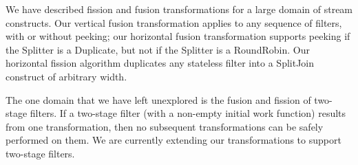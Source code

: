 We have described fission and fusion transformations for a large
domain of stream constructs.  Our vertical fusion transformation
applies to any sequence of filters, with or without peeking; our
horizontal fusion transformation supports peeking if the Splitter is a
Duplicate, but not if the Splitter is a RoundRobin.  Our horizontal
fission algorithm duplicates any stateless filter into a SplitJoin
construct of arbitrary width.

The one domain that we have left unexplored is the fusion and fission
of two-stage filters.  If a two-stage filter (with a non-empty initial
work function) results from one transformation, then no subsequent
transformations can be safely performed on them.  We are currently
extending our transformations to support two-stage filters.



